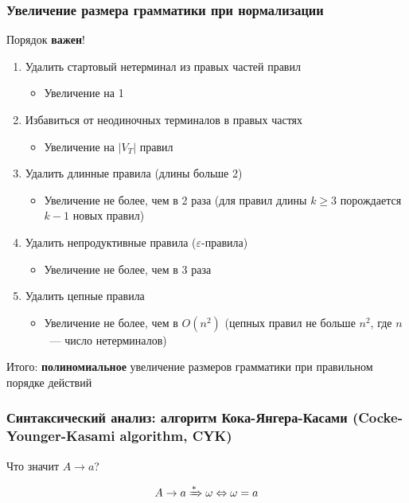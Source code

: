 \documentclass{beamer}
\newcommand{\derives}[1][*]{\xRightarrow[]{#1}}
\begin{document}
\begin{frame}[fragile]
  \transwipe[direction=90]
  \frametitle{Увеличение размера грамматики при нормализации}

\begin{center}
    Порядок \textbf{важен}!
\end{center}
  
  \begin{enumerate}
    \item Удалить стартовый нетерминал из правых частей правил 
    \begin{itemize}
      \item Увеличение на 1
    \end{itemize}
    \item Избавиться от неодиночных терминалов в правых частях 
    \begin{itemize}
      \item Увеличение на $|V_T|$ правил
    \end{itemize}
    \item Удалить длинные правила (длины больше 2)
    \begin{itemize}
      \item Увеличение не более, чем в 2 раза (для правил длины $k \geq 3$ порождается $k-1$ новых правил)
    \end{itemize}
    \item Удалить непродуктивные правила ($\varepsilon$-правила)
    \begin{itemize}
      \item Увеличение не более, чем в 3 раза
    \end{itemize}
    \item Удалить цепные правила
    \begin{itemize}
      \item Увеличение не более, чем в $O(n^2)$ (цепных правил не больше $n^2$, где $n$~--- число нетерминалов)
    \end{itemize}
  \end{enumerate}
  
  Итого: \textbf{полиномиальное} увеличение размеров грамматики при правильном порядке действий
\end{frame}

\begin{frame}[fragile]
  \transwipe[direction=90]
  \frametitle{Синтаксический анализ: алгоритм Кока-Янгера-Касами (Cocke-Younger-Kasami algorithm, CYK)}
  
  \begin{center}
    Что значит $A \to a$?
  \end{center} \pause

 \[ A \to a  \derives \omega \Leftrightarrow \omega = a \]
\end{frame}
\end{document}
